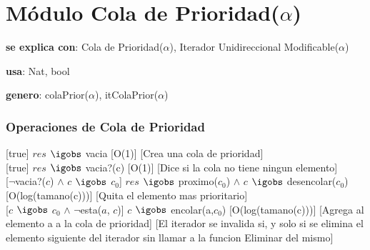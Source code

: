 


\section{Módulo Cola de Prioridad($\alpha$)}

\begin{Interfaz}

  \textbf{se explica con}: Cola de Prioridad($\alpha$), Iterador Unidireccional Modificable($\alpha$)

  \textbf{usa}: Nat, bool
  
  \textbf{genero}: colaPrior($\alpha$), itColaPrior($\alpha$)
  
\subsubsection{Operaciones de Cola de Prioridad}

  [true]
  {$res$ $\igobs$ vacia}
  [O(1)]
  [Crea una cola de prioridad]\\ 
  
  [true]
  {$res$ $\igobs$ vacia?(c)}
  [O(1)]
  [Dice si la cola no tiene ningun elemento]\\ 

  [$\neg$vacia?($c$) $\land$ $c$ $\igobs$ $c_0$]
  {$res$ $\igobs$ proximo($c_0$) $\land$ $c$ $\igobs$ desencolar($c_0$)}
  [O(log(tamano(c)))]
  [Quita el elemento mas prioritario]\\   
  
  [$c$ $\igobs$ $c_0$ $\land$ $\neg$esta($a$, $c$)] %
  {$c$ $\igobs$ encolar(a,$c_0$)}
  [O(log(tamano(c)))]
  [Agrega al elemento a a la cola de prioridad]
  [El iterador se invalida si, y solo si se elimina el elemento siguiente del iterador sin llamar a la funcion Eliminar del mismo]\\ 
\end{Interfaz}


